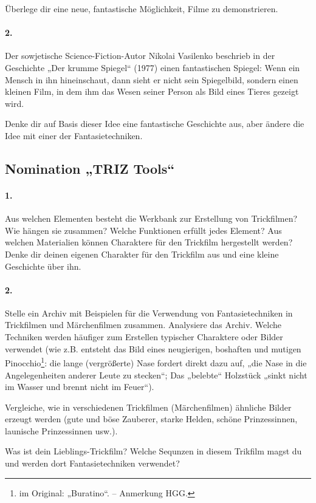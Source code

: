 \documentclass[11pt,a4paper]{article}
\begin{document}
Überlege dir eine neue, fantastische Möglichkeit, Filme zu demonstrieren.

\paragraph{2.}
Der sowjetische Science-Fiction-Autor Nikolai Vasilenko beschrieb in der
Geschichte „Der krumme Spiegel“ (1977) einen fantastischen Spiegel: Wenn ein
Mensch in ihn hineinschaut, dann sieht er nicht sein Spiegelbild, sondern
einen kleinen Film, in dem ihm das Wesen seiner Person als Bild eines Tieres
gezeigt wird.

Denke dir auf Basis dieser Idee eine fantastische Geschichte aus, aber ändere
die Idee mit einer der Fantasietechniken.

\subsection*{Nomination „TRIZ Tools“}

\paragraph{1.}
Aus welchen Elementen besteht die Werkbank zur Erstellung von Trickfilmen? Wie
hängen sie zusammen?  Welche Funktionen erfüllt jedes Element?  Aus welchen
Materialien können Charaktere für den Trickfilm hergestellt werden?  Denke dir
deinen eigenen Charakter für den Trickfilm aus und eine kleine Geschichte über
ihn.

\paragraph{2.}
Stelle ein Archiv mit Beispielen für die Verwendung von Fantasietechniken in
Trickfilmen und Märchenfilmen zusammen. Analysiere das Archiv. Welche
Techniken werden häufiger zum Erstellen typischer Charaktere oder Bilder
verwendet (wie z.B. entsteht das Bild eines neugierigen, boshaften und mutigen
Pinocchio\footnote{im Original: „Buratino“. -- Anmerkung HGG.}: die lange
(vergrößerte) Nase fordert direkt dazu auf, „die Nase in die Angelegenheiten
anderer Leute zu stecken“; Das „belebte“ Holzstück „sinkt nicht im Wasser und
brennt nicht im Feuer“).

Vergleiche, wie in verschiedenen Trickfilmen (Märchenfilmen) ähnliche Bilder
erzeugt werden (gute und böse Zauberer, starke Helden, schöne Prinzessinnen,
launische Prinzessinnen usw.).

Was ist dein Lieblings-Trickfilm? Welche Sequnzen in diesem Trikfilm magst du
und werden dort Fantasietechniken verwendet?
\end{document}
